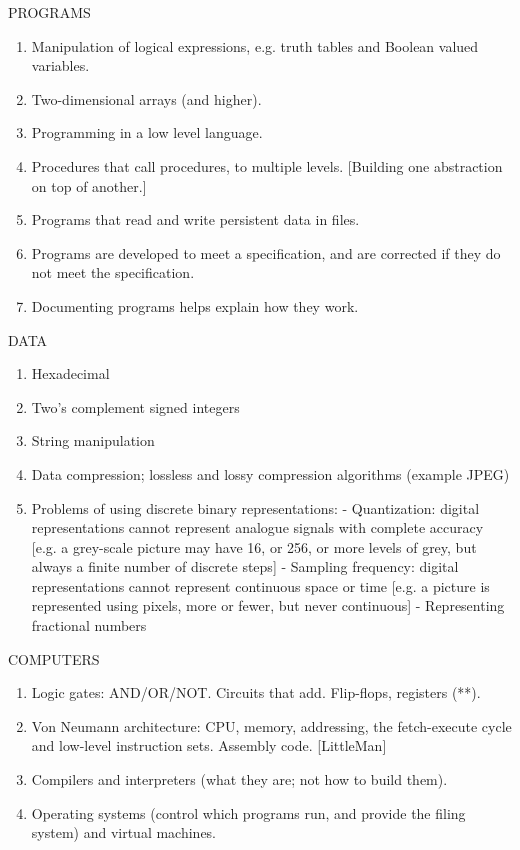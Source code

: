 PROGRAMS
\begin{enumerate}
\item Manipulation of logical expressions, e.g. truth tables and Boolean valued variables.
\item Two-dimensional arrays (and higher).
\item Programming in a low level language.
\item Procedures that call procedures, to multiple levels. [Building one abstraction on top
of another.]
\item Programs that read and write persistent data in files.
\item Programs are developed to meet a specification, and are corrected if they do not
meet the specification.
\item Documenting programs helps explain how they work.
\end{enumerate}

DATA
\begin{enumerate}
\item Hexadecimal
\item Two’s complement signed integers
\item String manipulation
\item Data compression; lossless and lossy compression algorithms (example JPEG)
\item Problems of using discrete binary representations:
- Quantization: digital representations cannot represent analogue signals with
complete accuracy [e.g. a grey-scale picture may have 16, or 256, or more
levels of grey, but always a finite number of discrete steps]
- Sampling frequency: digital representations cannot represent continuous
space or time [e.g. a picture is represented using pixels, more or fewer, but
never continuous]
- Representing fractional numbers
\end{enumerate}

COMPUTERS
\begin{enumerate}
\item Logic gates: AND/OR/NOT. Circuits that add. Flip-flops, registers (**).
\item Von Neumann architecture: CPU, memory, addressing, the fetch-execute cycle and
low-level instruction sets. Assembly code. [LittleMan]
\item Compilers and interpreters (what they are; not how to build them).
\item Operating systems (control which programs run, and provide the filing system) and
virtual machines.
\end{enumerate}

